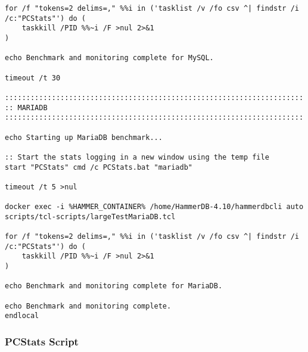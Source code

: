 \begin{lstlisting}[caption={Batch script to run the TCL scripts}, label={lst:batch-script}]
for /f "tokens=2 delims=," %%i in ('tasklist /v /fo csv ^| findstr /i /c:"PCStats"') do (
    taskkill /PID %%~i /F >nul 2>&1
)

echo Benchmark and monitoring complete for MySQL.

timeout /t 30

::::::::::::::::::::::::::::::::::::::::::::::::::::::::::::::::::::::
:: MARIADB
::::::::::::::::::::::::::::::::::::::::::::::::::::::::::::::::::::::

echo Starting up MariaDB benchmark...

:: Start the stats logging in a new window using the temp file
start "PCStats" cmd /c PCStats.bat "mariadb"

timeout /t 5 >nul

docker exec -i %HAMMER_CONTAINER% /home/HammerDB-4.10/hammerdbcli auto scripts/tcl-scripts/largeTestMariaDB.tcl

for /f "tokens=2 delims=," %%i in ('tasklist /v /fo csv ^| findstr /i /c:"PCStats"') do (
    taskkill /PID %%~i /F >nul 2>&1
)

echo Benchmark and monitoring complete for MariaDB.

echo Benchmark and monitoring complete.
endlocal
\end{lstlisting}

\subsubsection{PCStats Script}
\label{sec:pcstats-script}

